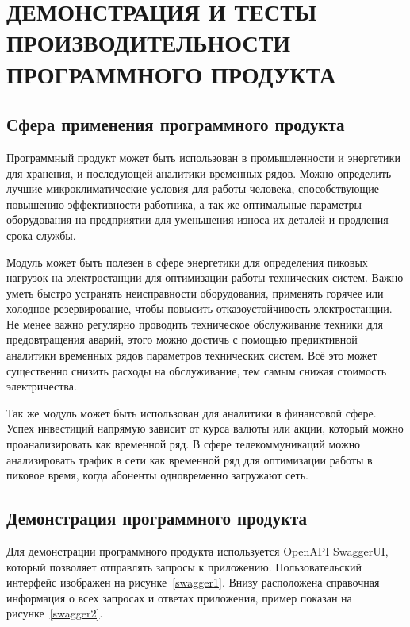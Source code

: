 \section{ДЕМОНСТРАЦИЯ И ТЕСТЫ ПРОИЗВОДИТЕЛЬНОСТИ ПРОГРАММНОГО ПРОДУКТА}

\subsection{Сфера применения программного продукта}

Программный продукт может быть использован в промышленности и энергетики для хранения, и последующей аналитики временных рядов. Можно определить лучшие микроклиматические условия для работы человека, способствующие повышению эффективности работника, а так же оптимальные параметры оборудования на предприятии для уменьшения износа их деталей и продления срока службы.

Модуль может быть полезен в сфере энергетики для определения пиковых нагрузок на электростанции для оптимизации работы технических систем. Важно уметь быстро устранять неисправности оборудования, применять горячее или холодное резервирование, чтобы повысить отказоустойчивость электростанции. Не менее важно регулярно проводить техническое обслуживание техники для предовтращения аварий, этого можно достичь с помощью предиктивной аналитики временных рядов параметров технических систем. Всё это может существенно снизить расходы на обслуживание, тем самым снижая стоимость электричества.

Так же модуль может быть использован для аналитики в финансовой сфере. Успех инвестиций напрямую зависит от курса валюты или акции, который можно проанализировать как временной ряд. В сфере телекоммуникаций можно анализировать трафик в сети как временной ряд для оптимизации работы в пиковое время, когда абоненты одновременно загружают сеть.

\subsection{Демонстрация программного продукта}

Для демонстрации программного продукта используется OpenAPI SwaggerUI, который позволяет отправлять запросы к приложению. Пользовательский интерфейс изображен на рисунке~\ref{swagger1}. Внизу расположена справочная информация о всех запросах и ответах приложения, пример показан на рисунке~\ref{swagger2}.

